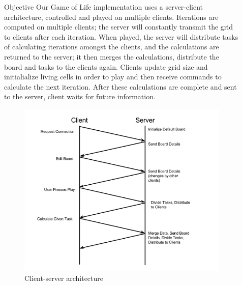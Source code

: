 \documentclass[final]{beamer}
\newlength{\sepwid}
\newlength{\onecolwid}
\newlength{\twocolwid}
\begin{document}
\begin{frame}[t]
\begin{columns}[t]
\begin{column}{\onecolwid}
\begin{block}{Objective}
	Our Game of Life implementation uses a server-client architecture, controlled and played on multiple clients. Iterations are computed on multiple clients; the server will constantly transmit the grid to clients after each iteration. When played, the server will distribute tasks of calculating iterations amongst the clients, and the calculations are returned to the server; it then merges the calculations, distribute the board and tasks to the clients again. Clients update grid size and initialialize living cells in order to play and then receive commands to calculate the next iteration. After these calculations are complete and sent to the server, client waits for future information.
\end{block}


\begin{figure}
\includegraphics[width=0.8\linewidth]{client_server_architecture.jpg}
\caption{Client-server architecture}
\end{figure}


\end{column} %

\begin{column}{\sepwid}\end{column} %

\begin{column}{\twocolwid} %


\end{column}
\end{columns}
\end{frame}
\end{document}
